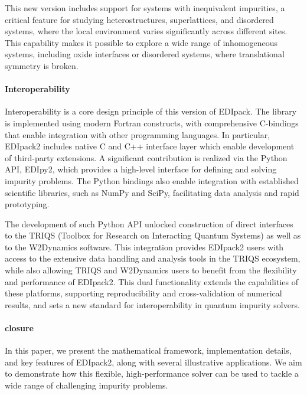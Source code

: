 \documentclass[edipack2.tex]{subfiles}
\begin{document}
This new version includes support for systems with inequivalent
impurities, a critical feature for studying heterostructures,
superlattices, and disordered systems, where the local environment
varies significantly across different sites. This capability makes it
possible to explore a wide range of inhomogeneous systems, including
oxide interfaces or disordered systems, where
translational symmetry is broken.


\paragraph{Interoperability}
Interoperability is a core design principle of this version of 
EDIpack. The library is implemented using modern Fortran constructs, with comprehensive
C-bindings that enable integration with other programming
languages. In particular, EDIpack2 includes native  C and C++
interface layer which enable development of third-party
extensions. A significant contribution is realized via the Python API, EDIpy2, which provides a
high-level interface for defining and solving impurity problems. The
Python bindings also enable integration with established scientific
libraries, such as NumPy and SciPy, facilitating data analysis and
rapid prototyping.

The development of such Python API unlocked construction of direct interfaces to the TRIQS
(Toolbox for Research on Interacting Quantum Systems)  as
well as to the W2Dynamics software.
This integration provides EDIpack2 users with access to the
extensive data handling and analysis tools in the TRIQS ecosystem,
while also allowing TRIQS and W2Dynamics users to benefit from the
flexibility and performance of EDIpack2. This dual functionality
extends the capabilities of these platforms, supporting
reproducibility and cross-validation of numerical results, and sets a
new standard for interoperability in quantum impurity solvers.

\paragraph{closure}
In this paper, we present the mathematical framework, implementation
details, and key features of EDIpack2, along with several illustrative
applications. We aim to demonstrate how this flexible,
high-performance solver can be used to tackle a wide range of
challenging impurity problems. 
\end{document}
